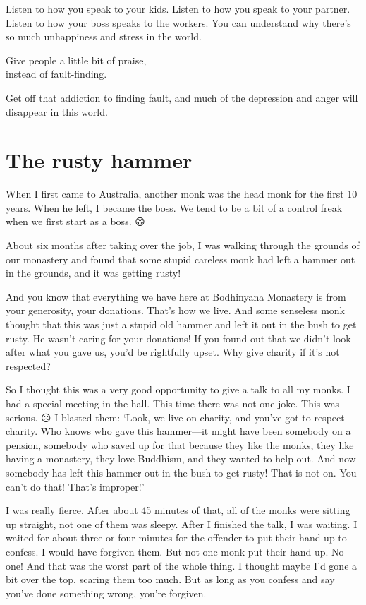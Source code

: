 \documentclass[12pt, openany]{book}
\newenvironment{aphorism}%
{%
\begin{center}\begin{itshape}
}%
{\end{itshape}\end{center}
}%
\begin{document}
Listen to how you speak to your kids. Listen to how you speak to your partner. Listen to how your boss speaks to the workers. You can understand why there’s so much unhappiness and stress in the world. 

\begin{aphorism}
Give people a little bit of praise,\\  
instead of fault-finding.
\end{aphorism}

Get off that addiction to finding fault, and much of the depression and anger will disappear in this world. 

\section*{The rusty hammer}

When I first came to Australia, another monk was the head monk for the first 10 years. When he left, I became the boss. We tend to be a bit of a control freak when we first start as a boss. 😁

About six months after taking over the job, I was walking through the grounds of our monastery and found that some stupid careless monk had left a hammer out in the grounds, and it was getting rusty! 

And you know that everything we have here at Bodhinyana Monastery is from your generosity, your donations. That’s how we live. And some senseless monk thought that this was just a stupid old hammer and left it out in the bush to get rusty. He wasn’t caring for your donations! If you found out that we didn’t look after what you gave us, you’d be rightfully upset. Why give charity if it’s not respected? 

So I thought this was a very good opportunity to give a talk to all my monks. I had a special meeting in the hall. This time there was not one joke. This was serious. ☹ I blasted them: ‘Look, we live on charity, and you’ve got to respect charity. Who knows who gave this hammer—it might have been somebody on a pension, somebody who saved up for that because they like the monks, they like having a monastery, they love Buddhism, and they wanted to help out. And now somebody has left this hammer out in the bush to get rusty! That is not on. You can’t do that! That’s improper!’ 

I was really fierce. After about 45 minutes of that, all of the monks were sitting up straight, not one of them was sleepy. After I finished the talk, I was waiting. I waited for about three or four minutes for the offender to put their hand up to confess. I would have forgiven them. But not one monk put their hand up. No one! And that was the worst part of the whole thing. I thought maybe I’d gone a bit over the top, scaring them too much. But as long as you confess and say you’ve done something wrong, you’re forgiven. 
\end{document}
